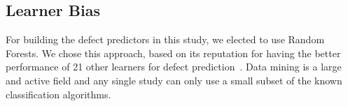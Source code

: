 \documentclass{sig-alternate}
\newcommand{\bi}{\begin{itemize}}
\newcommand{\ei}{\end{itemize}}
\newcommand{\tion}[1]{\textsection\ref{sect:#1}}
\newcommand{\fig}[1]{Figure~\ref{fig:#1}}
\begin{document}
\begin{itemize}





\subsection{ Learner Bias}
For building the defect predictors in this study, we elected
to use  Random Forests. We chose this approach,  based on its reputation for having the better  performance of 21 other learners for defect prediction~\cite{lessmann}. Data mining is a large and active field and any single study can only use a small subset of the known classification algorithms.  


\end{itemize}
\end{document}
